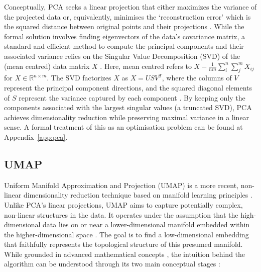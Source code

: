 \documentclass[10pt,oneside]{report}
\begin{document}
Conceptually, PCA seeks a linear projection that either maximizes the variance of the projected data or, equivalently, minimises the `reconstruction error' which is the squared distance between original points and their projections \cite{udell2016generalized}. While the formal solution involves finding eigenvectors of the data's covariance matrix, a standard and efficient method to compute the principal components and their associated variance relies on the Singular Value Decomposition (SVD) of the (mean centred) data matrix $X$ \cite{steinberger2005text, udell2016generalized}. Here, mean centred refers to $X - \frac{1}{nm}\sum_i^n \sum_j^m X_{ij}$ for $X \in \mathbb{R} ^{n\times m}$. The SVD factorizes $X$ as $X = USV^T$, where the columns of $V$ represent the principal component directions, and the squared diagonal elements of $S$ represent the variance captured by each component \cite{udell2016generalized}. By keeping only the components associated with the largest singular values (a truncated SVD), PCA achieves dimensionality reduction while preserving maximal variance in a linear sense. A formal treatment of this as an optimisation problem can be found at Appendix~\ref{app:pca}.

\subsection{UMAP}\label{sec:umap}

Uniform Manifold Approximation and Projection (UMAP) is a more recent, non-linear dimensionality reduction technique based on manifold learning principles \cite{mcinnes2018umap}. Unlike PCA's linear projections, UMAP aims to capture potentially complex, non-linear structures in the data. It operates under the assumption that the high-dimensional data lies on or near a lower-dimensional manifold embedded within the higher-dimensional space \cite{mcinnes2018umap}. The goal is to find a low-dimensional embedding that faithfully represents the topological structure of this presumed manifold. While grounded in advanced mathematical concepts \cite{lee2003smooth, lee2006riemannian, willard2012general}, the intuition behind the algorithm can be understood through its two main conceptual stages \cite{mcinnes2018umap}:
\end{document}
